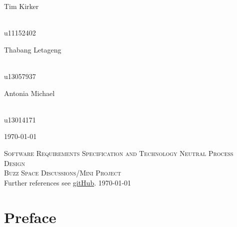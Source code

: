 \documentclass[a4paper,12pt]{report}
\begin{document}
\begin{titlepage}
\begin{center}
\begin{minipage}{0.4\textwidth}
\begin{flushleft} \large
Tim {Kirker}
\end{flushleft}
\end{minipage}
\begin{minipage}{0.4\textwidth}
\begin{flushright} \large
\emph{} \\
u11152402
\end{flushright}
\end{minipage}
\begin{minipage}{0.4\textwidth}
\begin{flushleft} \large
Thabang {Letageng}
\end{flushleft}
\end{minipage}
\begin{minipage}{0.4\textwidth}
\begin{flushright} \large
\emph{} \\
u13057937
\end{flushright}
\end{minipage}
\begin{minipage}{0.4\textwidth}
\begin{flushleft} \large
Antonia {Michael}
\end{flushleft}
\end{minipage}
\begin{minipage}{0.4\textwidth}
\begin{flushright} \large
\emph{} \\
u13014171
\end{flushright}
\end{minipage}
\vfill
{\large \today}
\end{center}
\end{titlepage}
\footnotesize

\normalsize

\renewcommand{\thesection}{\arabic{section}}
\newpage
\begin{center}
\textsc{\LARGE Software Requirements Specification and Technology Neutral Process Design}\\[1.5cm]
\textsc{\Large Buzz Space Discussions/Mini Project}\\[0.5cm]
Further references see \href{https://github.com/ACalitz/COS301Phase2Group1A.git}{gitHub}.
\today
\end{center}
\tableofcontents{}
\newpage
\section{Preface}
\end{document}
